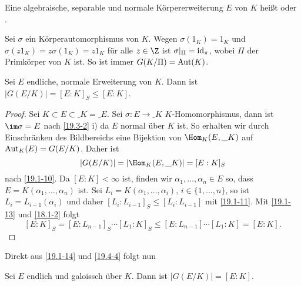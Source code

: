 \begin{df} \label{19.4-2}
	Eine algebraische, separable und normale Körpererweiterung $E$ von $K$ heißt  oder .
\end{df}

\begin{nt} \label{19.4-3}
	Sei $\sigma$ ein Körperautomorphismus von $K$.
	Wegen $\sigma(1_K) = 1_K$ und $\sigma(z 1_K) = z \sigma(1_K) = z 1_K$ für alle $z \in \Z$ ist $\sigma|_\Pi = \operatorname{id}_\pi$, wobei $\Pi$ der Primkörper von $K$ ist.
	So ist immer $G(K / \Pi) = \operatorname{Aut}(K)$.
\end{nt}

\begin{st} \label{19.4-4}
	Sei $E$ endliche, normale Erweiterung von $K$.
	Dann ist $|G(E/K)| = [E:K]_S \le [E:K]$.
	\begin{proof}
		Sei $K \subset E \subset \_K = \_E$.
		Sei $\sigma: E \to \_K$ $K$-Homomorphismus, dann ist $\im \sigma = E$ nach \ref{19.3-2} i) da $E$ normal über $K$ ist.
		So erhalten wir durch Einschränken des Bildbereichs eine Bijektion von $\Hom_K(E, \_K)$ auf $\operatorname{Aut}_K(E) = G(E/K)$.
		Daher ist
		\[
			|G(E / K)| = | \Hom_K(E, \_K)| = [E : K]_S
		\]
		nach \ref{19.1-10}.
		Da $[E : K] < \infty$ ist, finden wir $\alpha_1, \dotsc, \alpha_n \in E$ so, dass $E = K(\alpha_1, \dotsc, \alpha_n)$ ist.
		Sei $L_i = K(\alpha_1, \dotsc, \alpha_i)$, $i \in \{1, \dotsc, n\}$, so ist $L_i = L_{i-1}(\alpha_i)$ und daher $[L_i : L_{i-1}]_S \le [L_i : L_{i-1}]$ mit \ref{19.1-11}.
		Mit \ref{19.1-13} und \ref{18.1-2} folgt
		\[
			[E:K]_S = [E : L_{n-1}]_S \dotsb [L_1 : K]_S
			\le [E : L_{n-1}] \dotsb [L_1 : K]
			= [E : K].
		\]
	\end{proof}
\end{st}

Direkt aus \ref{19.1-14} und \ref{19.4-4} folgt nun

\begin{kor} \label{19.4-5}
	Sei $E$ endlich und galoissch über $K$.
	Dann ist $|G(E/K)| = [E:K]$.
\end{kor}


